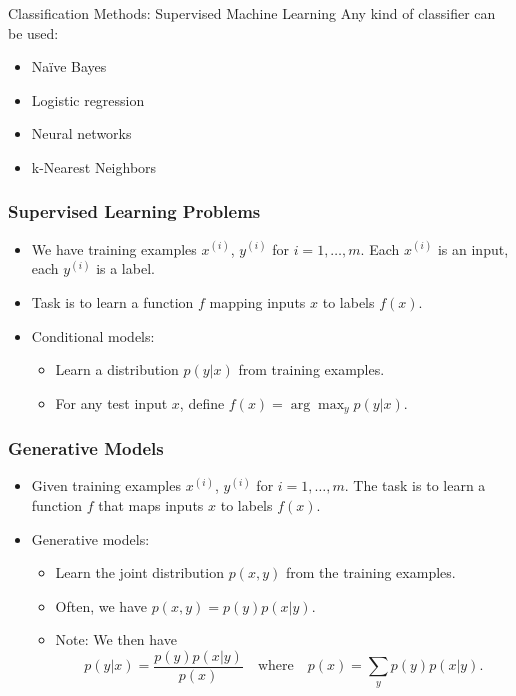 \documentclass[handout]{beamer}
\begin{document}
\begin{frame}{Classification Methods: Supervised Machine Learning}
    Any kind of classifier can be used:
    \begin{itemize}
        \item Naïve Bayes
        \item Logistic regression
        \item Neural networks
        \item k-Nearest Neighbors
    \end{itemize}
\end{frame}


\begin{frame}
  \frametitle{Supervised Learning Problems}
  \begin{itemize}
    \item We have training examples $x^{(i)}$, $y^{(i)}$ for $i = 1, \ldots, m$. Each $x^{(i)}$ is an input, each $y^{(i)}$ is a label.
    \item Task is to learn a function $f$ mapping inputs $x$ to labels $f(x)$.
    \item Conditional models:
    \begin{itemize}
      \item Learn a distribution $p(y|x)$ from training examples.
      \item For any test input $x$, define $f(x) = \arg \max_y p(y|x)$.
    \end{itemize}
  \end{itemize}
\end{frame}

\begin{frame}
  \frametitle{Generative Models}
  \begin{itemize}
    \item Given training examples $x^{(i)}$, $y^{(i)}$ for $i = 1, \ldots, m$. The task is to learn a function $f$ that maps inputs $x$ to labels $f(x)$.
    \item Generative models:
    \begin{itemize}
      \item Learn the joint distribution $p(x, y)$ from the training examples.
      \item Often, we have $p(x, y) = p(y)p(x|y)$.
      \item Note: We then have
      \[
        p(y|x) = \frac{p(y)p(x|y)}{p(x)} \quad \text{where} \quad p(x) = \sum_y p(y)p(x|y).
      \]
    \end{itemize}
  \end{itemize}
\end{frame}
\end{document}
